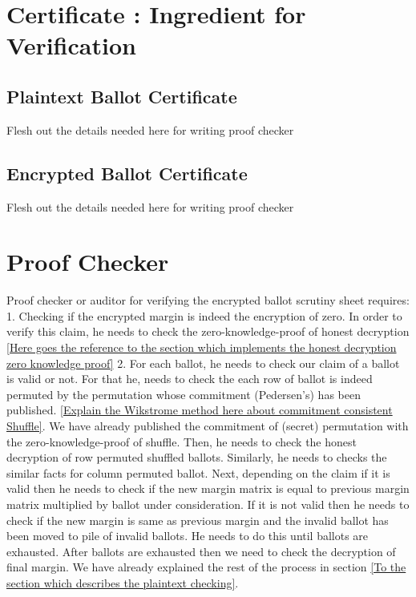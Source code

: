   
\section{Certificate : Ingredient for Verification}
   
   \subsection{Plaintext Ballot Certificate}
    Flesh out the details needed here for writing proof checker
    
    \subsection{Encrypted Ballot Certificate}
    Flesh out the details needed here for writing proof checker
    
   
\section{Proof Checker}
  Proof checker or auditor for verifying the encrypted ballot scrutiny sheet requires:
  1. Checking if the encrypted margin is indeed the encryption of zero.  In order to verify this claim, 
  he needs to check the zero-knowledge-proof of honest decryption \ref{Here goes the reference to the 
  section which implements the honest decryption zero knowledge proof}
  2. For each ballot, he needs to check our claim of a ballot is valid or not. For that he, needs to 
  check the each row of ballot is indeed permuted by the permutation whose commitment (Pedersen's) has been published. 
  \ref{Explain the Wikstrome method here about commitment consistent Shuffle}. 
  We have already published the commitment of (secret) permutation with the zero-knowledge-proof of shuffle. Then, he needs 
  to check the honest decryption of row permuted shuffled ballots. Similarly, he needs to checks the similar facts for column permuted 
  ballot. Next, depending on the claim if it is valid then he needs to check if the new margin matrix is equal to previous margin matrix 
  multiplied by ballot under consideration. If it is not valid then he needs to check if the new margin is same as previous margin and 
  the invalid ballot has been moved to pile of invalid ballots. He needs to do this until ballots are exhausted.  
  After ballots are exhausted then we need to check the decryption of final margin. We have already explained the 
  rest of the process in section \ref{To the section which describes the plaintext checking}.
  
